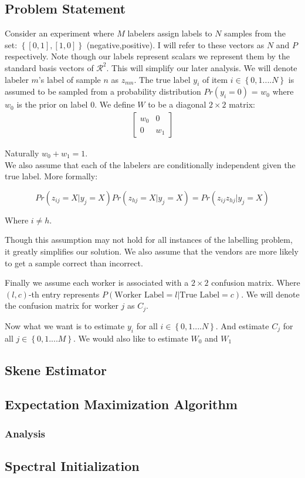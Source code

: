 \documentclass{article}
\begin{document}
\subsection{Problem Statement}
Consider an experiment where $M$ labelers assign labels to $N$ samples from the set: $\left\{[0,1],[1,0]\right\}$ (negative,positive). I will refer to these vectors as $N$ and $P$ respectively. Note though our labels represent scalars we represent them by the standard basis vectors of $\mathcal{R}^{2}$. This will simplify our later analysis. We will denote labeler $m$'s label of sample $n$ as $z_{mn}$. The true label $y_{i}$ of item
$i \in \left\{0,1....N\right\} $ is assumed to be sampled from a probability
distribution $Pr(y_{i} = 0)$ = $w_{0}$ where $w_{0}$ is the prior on label 0.  We define $W$ to be a diagonal $2 \times 2$ matrix:
\begin{align}
\begin{bmatrix}
w_{0} & 0 \\
0     & w_{1}
\end{bmatrix}
\end{align}

Naturally $w_{0} + w_{1} = 1$. \\

We also assume that each of the labelers are conditionally independent given the true label. More formally:

$$Pr(z_{ij} = X | y_{j} = X)Pr(z_{hj} = X | y_{j} = X) = Pr(z_{ij}z_{hj} | y_{j} = X)$$

Where $i \neq h$.

Though this assumption may not hold for all instances of the labelling problem, it greatly simplifies our solution. We also assume that the vendors are more likely to get a sample correct than incorrect.

Finally we assume each worker is associated with a $2 \times 2$ confusion matrix. Where $(l,c)$-th entry represents $P(\text{Worker Label} = l| \text{True Label} = c)$. We will denote the confusion matrix for worker $j$ as  $C_{j}$.

Now what we want is to estimate $y_{i}$ for all $i \in \left\{0,1....N\right\}$. And estimate $C_{j}$ for all $j \in \left\{0,1....M\right\}$. We would also like to estimate $W_{0}$ and $W_{1}$



\subsection{Skene Estimator}

\subsection{Expectation Maximization Algorithm}
\subsubsection{Analysis}

\subsection{Spectral Initialization}



\end{document}
